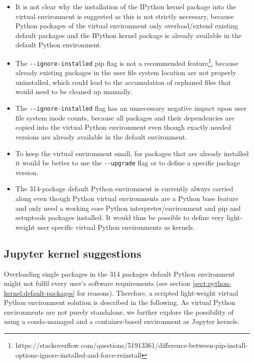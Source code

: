 \begin{itemize}

  \item It is not clear why the installation of the IPython kernel package into the virtual environment is suggested as this is not strictly necessary, because Python packages of the virtual environment only overload/extend existing default packages and the IPython kernel package is already available in the default Python environment.

  \item The \verb|--ignore-installed| pip flag is not a recommended feature\footnote{https://stackoverflow.com/questions/51913361/difference-between-pip-install-options-ignore-installed-and-force-reinstall}, because already existing packages in the user file system location are not properly uninstalled, which could lead to the accumulation of orphaned files that would need to be cleaned up manually.

  \item The \verb|--ignore-installed| flag has an unnecessary negative impact upon user file system inode counts, because all packages and their dependencies are copied into the virtual Python environment even though exactly needed versions are already available in the default environment.

  \item To keep the virtual environment small, for packages that are already installed it would be better to use the \verb|--upgrade| flag or to define a specific package version.

  \item The 314-package default Python environment is currently always carried along even though Python virtual environments are a Python base feature and only need a working core Python interpreter/environment and pip and setuptools packages installed.  It would thus be possible to define very light-weight user specific virtual Python environments as kernels.

\end{itemize}

\subsection{Jupyter kernel suggestions}
\label{sect:jupyter-kernel-suggestions}

Overloading single packages in the 314 packages default Python environment might not fulfil every user's software requirements (see section \ref{sect:python-kernel:default-packages} for reasons).
Therefore, a scripted light-weight virtual Python environment solution is described in the following.
As virtual Python environments are not purely standalone, we further explore the possibility of using a conda-managed and a container-based environment as Jupyter kernels.

